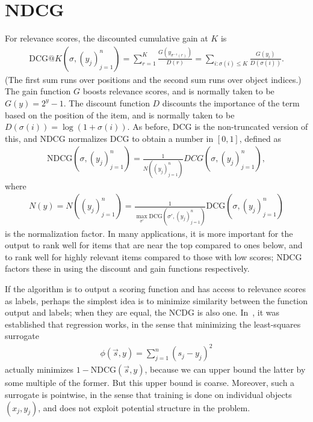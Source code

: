 \section{NDCG}
\label{sec:ndcg}
For relevance scores, the discounted cumulative gain at $K$ is 
\begin{align*}
  \text{DCG}@K(\sigma, (y_j)_{j=1}^n)
  = \sum_{r=1}^K \frac{G(y_{\sigma^{-1}(r)})}{D(r)}
  = \sum_{i: \sigma(i) \leq K} \frac{G(y_i)}{D(\sigma(i))}.
\end{align*}
(The first sum runs over positions and the second sum runs over
object indices.) The gain function $G$ boosts relevance scores, and is
normally taken to be $G(y) = 2^y - 1$. The discount function $D$ discounts
the importance of the term based on the position of the item, and is
normally taken to be $D(\sigma(i)) = \log(1 + \sigma(i))$. As before, DCG
is the non-truncated version of this, and NDCG normalizes DCG to obtain
a number in $[0,1]$, defined as
\begin{align*}
  \text{NDCG}(\sigma, (y_j)_{j=1}^n)
  = \frac{1}{N((y_j)_{j=1}^n)} DCG(\sigma, (y_j)_{j=1}^n),
\end{align*}
where
\begin{align*}
  N(y) = N((y_j)_{j=1}^n)
  = \frac{1}{\max_{\sigma'} \text{DCG}(\sigma', (y_j)_{j=1}^n)} \text{DCG}(\sigma, (y_j)_{j=1}^n)
\end{align*}
is the normalization factor. 
In many applications, it is more important for the output to rank well for
items that are near the top compared to ones below, and to rank well for
highly relevant items compared to those with low scores; NDCG factors
these in using the discount and gain functions respectively.

If the algorithm is to output a scoring function and has access to relevance
scores as labels, perhaps the simplest idea is to minimize similarity between
the function output and labels; when they are equal, the NCDG is also one.
In~\cite{cossock2008subset}, it was
established that regression works, in the sense that minimizing the least-squares
surrogate
\begin{align*}
  \phi(\vec{s}, y) = \sum_{j=1}^n {(s_j - y_j)}^2
\end{align*}
actually minimizes $1 - \text{NDCG}(\vec{s}, y)$, because we can upper bound
the latter by some multiple of the former. But this upper bound is coarse.
Moreover, such a surrogate is pointwise, in the sense
that training is done on individual objects $(x_j, y_j)$, and does not
exploit potential structure in the problem.

